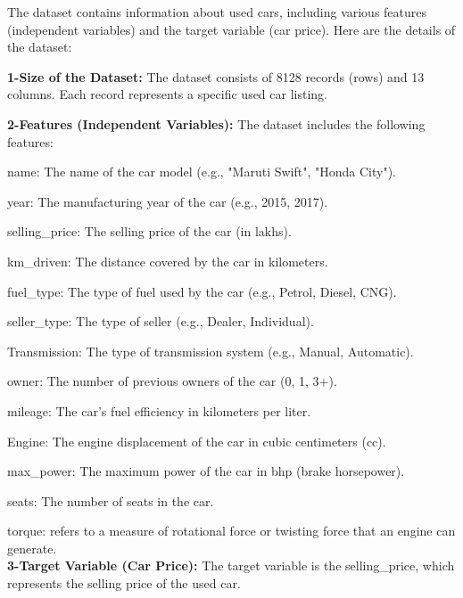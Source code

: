 \documentclass{article}
\begin{document}
The dataset contains information about used cars, including various features (independent variables) and the target variable (car price). Here are the details of the dataset:
\begin{flushleft}
\textbf{1-Size of the Dataset:}
The dataset consists of 8128 records (rows) and 13 columns.
Each record represents a specific used car listing.

\textbf{2-Features (Independent Variables):}
The dataset includes the following features:
\item [\ding{169}]name: The name of the car model (e.g., "Maruti Swift", "Honda City").\\
\item [\ding{169}]year: The manufacturing year of the car (e.g., 2015, 2017).\\
\item [\ding{169}]selling\_price: The selling price of the car (in lakhs).\\
\item [\ding{169}]km\_driven: The distance covered by the car in kilometers.\\
\item [\ding{169}]fuel\_type: The type of fuel used by the car (e.g., Petrol, Diesel, CNG).\\
\item [\ding{169}]seller\_type: The type of seller (e.g., Dealer, Individual).\\
\item [\ding{169}]Transmission: The type of transmission system (e.g., Manual, Automatic).\\
\item [\ding{169}]owner: The number of previous owners of the car (0, 1, 3+).\\
\item [\ding{169}]mileage: The car's fuel efficiency in kilometers per liter.\\
\item [\ding{169}]Engine: The engine displacement of the car in cubic centimeters (cc).\\
\item [\ding{169}]max\_power: The maximum power of the car in bhp (brake horsepower).\\
\item [\ding{169}]seats: The number of seats in the car.\\
\item [\ding{169}]torque: refers to a measure of rotational force or twisting force that an engine can generate.\\

\textbf{3-Target Variable (Car Price):}
The target variable is the selling\_price, which represents the selling price of the used car.
\end{flushleft}
\end{document}

